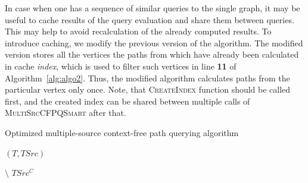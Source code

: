 In case when one has a sequence of similar queries to the single graph, it may be useful to cache results of the query evaluation and share them between queries.
This may help to avoid recalculation of the already computed results.
To introduce  caching, we modify the previous version of the algorithm.
The modified version stores all the vertices the paths from which have already been calculated in cache \textit{index}, which is used to filter such vertices in line \textbf{11} of Algorithm~\ref{alg:algo2}.
Thus, the modified algorithm calculates paths from the particular vertex only once.
Note, that \textsc{CreateIndex} function should be called first, and the created index can be shared between multiple calls of \textsc{MultiSrcCFPQSmart} after that.

\begin{algorithm}
\begin{algorithmic}[1]
\caption{Optimized multiple-source context-free path querying algorithm}
\label{alg:algo2}


     
        \EndFor
    \EndFor

    \State \Return $(T, TSrc)$
\EndFunction
\State
{}


    \EndFor


             $\setminus$ $TSrc^C$
        \EndFor
    \EndWhile
\EndFunction


\end{algorithmic}
\end{algorithm}


